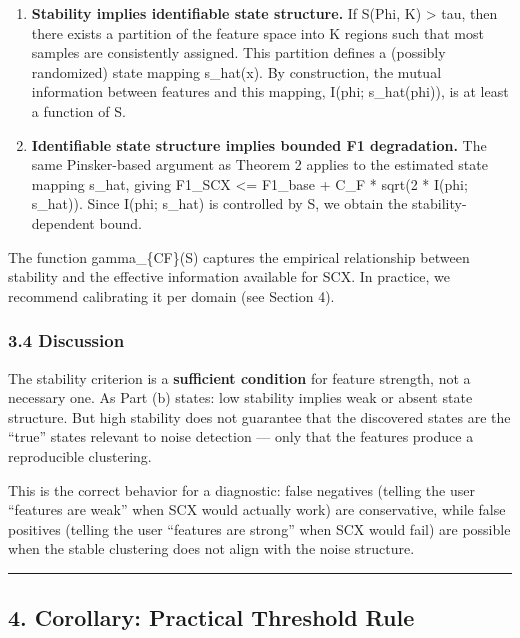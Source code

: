 \documentclass[
  12pt,
]{article}
\begin{document}
\begin{enumerate}
\def\labelenumi{\arabic{enumi}.}
\item
  \textbf{Stability implies identifiable state structure.} If S(Phi, K)
  \textgreater{} tau, then there exists a partition of the feature space
  into K regions such that most samples are consistently assigned. This
  partition defines a (possibly randomized) state mapping s\_hat(x). By
  construction, the mutual information between features and this
  mapping, I(phi; s\_hat(phi)), is at least a function of S.
\item
  \textbf{Identifiable state structure implies bounded F1 degradation.}
  The same Pinsker-based argument as Theorem 2 applies to the estimated
  state mapping s\_hat, giving F1\_SCX \textless= F1\_base + C\_F *
  sqrt(2 * I(phi; s\_hat)). Since I(phi; s\_hat) is controlled by S, we
  obtain the stability-dependent bound.
\end{enumerate}

The function gamma\_\{CF\}(S) captures the empirical relationship
between stability and the effective information available for SCX. In
practice, we recommend calibrating it per domain (see Section 4).

\subsubsection{3.4 Discussion}\label{discussion}

The stability criterion is a \textbf{sufficient condition} for feature
strength, not a necessary one. As Part (b) states: low stability implies
weak or absent state structure. But high stability does not guarantee
that the discovered states are the ``true'' states relevant to noise
detection --- only that the features produce a reproducible clustering.

This is the correct behavior for a diagnostic: false negatives (telling
the user ``features are weak'' when SCX would actually work) are
conservative, while false positives (telling the user ``features are
strong'' when SCX would fail) are possible when the stable clustering
does not align with the noise structure.

\begin{center}\rule{0.5\linewidth}{0.5pt}\end{center}

\subsection{4. Corollary: Practical Threshold
Rule}\label{corollary-practical-threshold-rule}
\end{document}
